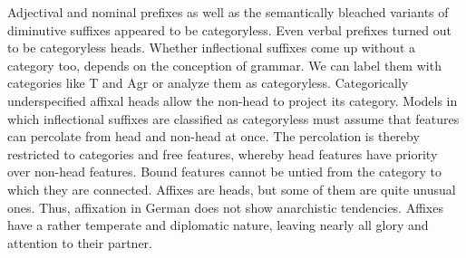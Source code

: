 \documentclass[output=paper
  ,nobabel
  ,draftmode
  ,colorlinks, citecolor=brown
]{langscibook}
\begin{document}
Adjectival and nominal prefixes as well as the semantically bleached variants of diminutive suffixes appeared to be categoryless. Even verbal prefixes turned out to be categoryless heads. Whether inflectional suffixes come up without a category too, depends on the conception of grammar. We can label them with categories like T and Agr or analyze them as categoryless. Categorically underspecified affixal heads allow the non-head to project its category. Models in which inflectional suffixes are classified as categoryless must assume that features can percolate from head and non-head at once. The percolation is thereby restricted to categories and free features, whereby head features have priority over non-head features. Bound features cannot be untied from the category to which they are connected. Affixes are heads, but some of them are quite unusual ones. Thus, affixation in German does not show anarchistic tendencies. Affixes have a rather temperate and diplomatic nature, leaving nearly all glory and attention to their partner.


{\sloppy
\printbibliography[heading=subbibliography,notkeyword=this]
}
\end{document}
